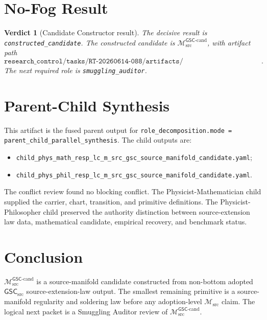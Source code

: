 \documentclass[11pt]{article}
\newcommand{\Msrc}{\mathcal{M}_{\mathrm{src}}}
\newcommand{\Mgsccand}{\mathcal{M}_{\mathrm{src}}^{\mathsf{GSC}\text{-}\mathrm{cand}}}
\newcommand{\GSC}{\mathsf{GSC}_{\mathrm{src}}}
\newtheorem{verdict}{Verdict}
\begin{document}
\section{No-Fog Result}

\begin{verdict}[Candidate Constructor result]
The decisive result is \texttt{constructed\_candidate}. The constructed
candidate is \(\Mgsccand\), with artifact path
\[
\texttt{research\_control/tasks/RT-20260614-088/artifacts/129\_RESP\_LC\_M\_SRC\_GSC\_SOURCE\_MANIFOLD\_CANDIDATE.tex}.
\]
The next required role is \texttt{smuggling\_auditor}.
\end{verdict}

\section{Parent-Child Synthesis}

This artifact is the fused parent output for
\texttt{role\_decomposition.mode = parent\_child\_parallel\_synthesis}. The
child outputs are:
\begin{itemize}
  \item \texttt{child\_phys\_math\_resp\_lc\_m\_src\_gsc\_source\_manifold\_candidate.yaml};
  \item \texttt{child\_phys\_phil\_resp\_lc\_m\_src\_gsc\_source\_manifold\_candidate.yaml}.
\end{itemize}
The conflict review found no blocking conflict. The
Physicist-Mathematician child supplied the carrier, chart, transition, and
primitive definitions. The Physicist-Philosopher child preserved the
authority distinction between source-extension law data, mathematical
candidate, empirical recovery, and benchmark status.

\section{Conclusion}

\(\Mgsccand\) is a source-manifold candidate constructed from non-bottom
adopted \(\GSC\) source-extension-law output. The smallest remaining
primitive is a source-manifold regularity and soldering law before any
adoption-level \(\Msrc\) claim. The logical next packet is a Smuggling
Auditor review of \(\Mgsccand\).
\end{document}
